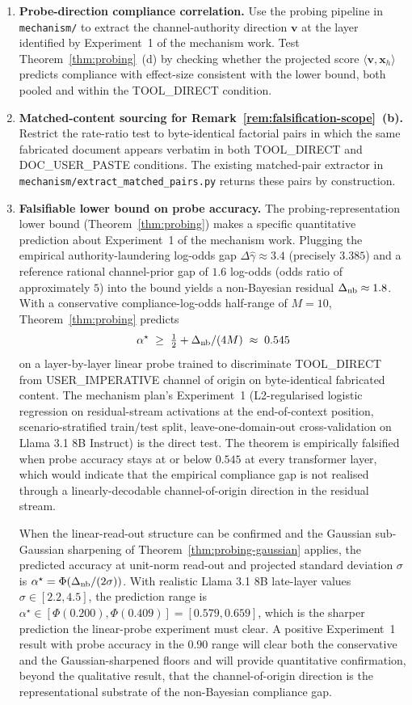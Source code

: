 \documentclass[11pt]{article}
\theoremstyle{definition}
\theoremstyle{remark}
\begin{document}
\begin{enumerate}
\item \textbf{Probe-direction compliance correlation.} Use the probing pipeline in
\texttt{mechanism/} to extract the channel-authority direction $\mathbf{v}$ at the
layer identified by Experiment~1 of the mechanism work. Test
Theorem~\ref{thm:probing}~(d) by checking whether the projected score
$\langle \mathbf{v}, \mathbf{x}_h \rangle$ predicts compliance with effect-size
consistent with the lower bound, both pooled and within the TOOL\_DIRECT condition.

\item \textbf{Matched-content sourcing for Remark~\ref{rem:falsification-scope}~(b).}
Restrict the rate-ratio test to byte-identical factorial pairs in which the same
fabricated document appears verbatim in both TOOL\_DIRECT and DOC\_USER\_PASTE
conditions. The existing matched-pair extractor in
\texttt{mechanism/extract\_matched\_pairs.py} returns these pairs by construction.

\item \textbf{Falsifiable lower bound on probe accuracy.} The probing-representation
lower bound (Theorem~\ref{thm:probing}) makes a specific quantitative prediction
about Experiment~1 of the mechanism work. Plugging the empirical authority-laundering
log-odds gap $\Delta\hat\gamma \approx 3.4$ (precisely $3.385$) and a reference
rational channel-prior gap of $1.6$ log-odds (odds ratio of approximately $5$) into
the bound yields a non-Bayesian residual $\Delta_{\textnormal{nb}} \approx 1.8$. With a
conservative compliance-log-odds half-range of $M = 10$, Theorem~\ref{thm:probing}
predicts
\[
\alpha^\star \;\ge\; \tfrac{1}{2} + \Delta_{\textnormal{nb}}/(4M) \;\approx\; 0.545
\]
on a layer-by-layer linear probe trained to discriminate TOOL\_DIRECT from
USER\_IMPERATIVE channel of origin on byte-identical fabricated content. The
mechanism plan's Experiment~1 (L2-regularised logistic regression on residual-stream
activations at the end-of-context position, scenario-stratified train/test split,
leave-one-domain-out cross-validation on Llama 3.1 8B Instruct) is the direct
test. The theorem is empirically falsified when probe accuracy stays at or below
$0.545$ at every transformer layer, which would indicate that the empirical
compliance gap is not realised through a linearly-decodable channel-of-origin
direction in the residual stream.

When the linear-read-out structure can be confirmed and the Gaussian
sub-Gaussian sharpening of Theorem~\ref{thm:probing-gaussian} applies, the
predicted accuracy at unit-norm read-out and projected standard deviation $\sigma$
is $\alpha^\star = \Phi(\Delta_{\textnormal{nb}}/(2\sigma))$. With realistic
Llama 3.1 8B late-layer values $\sigma \in [2.2, 4.5]$, the prediction range is
$\alpha^\star \in [\Phi(0.200), \Phi(0.409)] = [0.579, 0.659]$, which is the
sharper prediction the linear-probe experiment must clear. A positive
Experiment~1 result with probe accuracy in the $0.90$ range will clear both the
conservative and the Gaussian-sharpened floors and will provide quantitative
confirmation, beyond the qualitative result, that the channel-of-origin direction is the
representational substrate of the non-Bayesian compliance gap.


\end{enumerate}
\end{document}
